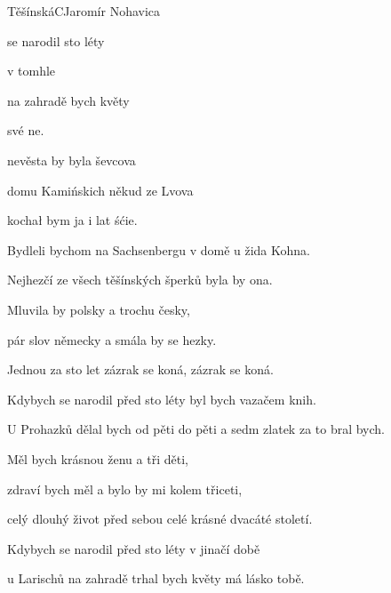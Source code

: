 \setcounter{page}{86}
\begin{song}{Těšínská}{C}{Jaromír Nohavica}

\begin{SBVerse}

 se narodil  sto léty  

v tomhle   {}

 na zahradě  bych květy 

své ne.

 nevěsta by byla  ševcova

 domu Kamińskich někud ze Lvova

kochał bym ja i   lat śćie.      

\end{SBVerse}

\begin{SBVerse}

Bydleli bychom na Sachsenbergu v domě u žida Kohna.

Nejhezčí ze všech těšínských šperků byla by ona.

Mluvila by polsky a trochu česky,

pár slov německy a smála by se hezky.

Jednou za sto let zázrak se koná, zázrak se koná.

\end{SBVerse}

\begin{SBVerse}

Kdybych se narodil před sto léty byl bych vazačem knih.

U Prohazků dělal bych od pěti do pěti a sedm zlatek za to bral bych.

Měl bych krásnou ženu a tři děti,

zdraví bych měl a bylo by mi kolem třiceti,

celý dlouhý život před sebou celé krásné dvacáté století.

\end{SBVerse}

\begin{SBVerse}

Kdybych se narodil před sto léty v jinačí době

u Larischů na zahradě trhal bych květy má lásko tobě.


\end{SBVerse}
\end{song}
